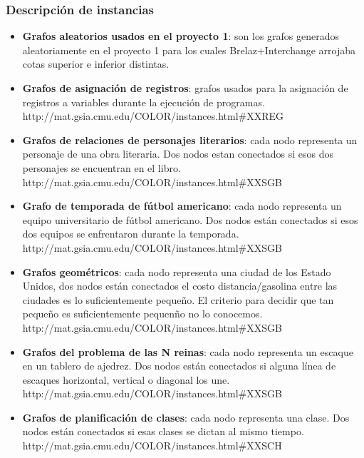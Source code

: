 \documentclass[a4paper,10pt]{article}
\begin{document}
\subsubsection{Descripci\'on de instancias}
\begin{itemize}
 \item \textbf{Grafos aleatorios usados en el proyecto 1}: son los
       grafos generados aleatoriamente en el proyecto 1 para los cuales
       Brelaz+Interchange arrojaba cotas superior e inferior distintas.
 \item \textbf{Grafos de asignaci\'on de registros}: grafos usados para
       la asignaci\'on de registros a variables durante la ejecuci\'on
       de programas.\\
       http://mat.gsia.cmu.edu/COLOR/instances.html#XXREG
 \item \textbf{Grafos de relaciones de personajes literarios}: cada nodo
       representa un personaje de una obra literaria. Dos nodos estan
       conectados si esos dos personajes se encuentran en el libro.\\
       http://mat.gsia.cmu.edu/COLOR/instances.html#XXSGB
 \item \textbf{Grafo de temporada de f\'utbol americano}: cada nodo
       representa un equipo universitario de f\'utbol americano. Dos
       nodos est\'an conectados si esos dos equipos se enfrentaron
       durante la temporada.\\
       http://mat.gsia.cmu.edu/COLOR/instances.html#XXSGB
 \item \textbf{Grafos geom\'etricos}: cada nodo representa una ciudad de
       los Estado Unidos, dos nodos est\'an conectados el costo
       distancia/gasolina entre las ciudades es lo suficientemente
       peque\~no. El criterio para decidir que tan peque\~no es
       suficientemente pequen\~no no lo conocemos.\\
       http://mat.gsia.cmu.edu/COLOR/instances.html#XXSGB
 \item \textbf{Grafos del problema de las N reinas}: cada nodo
       representa un escaque en un tablero de ajedrez. Dos nodos est\'an
       conectados si alguna l\'inea de escaques horizontal, vertical o
       diagonal los une.\\
       http://mat.gsia.cmu.edu/COLOR/instances.html#XXSGB
 \item \textbf{Grafos de planificaci\'on de clases}: cada nodo
       representa una clase. Dos nodos est\'an conectados si esas clases
       se dictan al mismo tiempo.
       http://mat.gsia.cmu.edu/COLOR/instances.html#XXSCH

\end{itemize}
\end{document}
